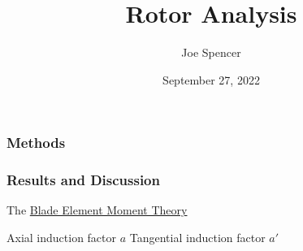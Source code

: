 \documentclass{article}
\begin{document}
\author{Joe Spencer}
\title{Rotor Analysis}
\date{September 27, 2022}
\maketitle

\subsubsection*{Methods}

\subsubsection*{Results and Discussion}

The \hyperlink{BEM}{Blade Element Moment Theory}

Axial induction factor $a$ Tangential induction factor $a'$

\clearpage
\end{document}
